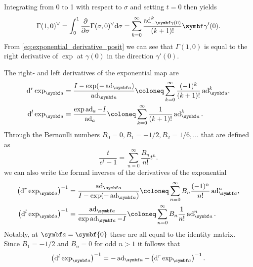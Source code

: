 Integrating from 0 to 1 with respect to $\sigma$ and setting $t = 0$ then yields
\begin{equation}
  \Gamma(1, 0)^\vee = \int_0^1 \frac{\partial}{\partial \sigma} \Gamma(\sigma, 0)^\vee \mathrm{d} \sigma = \sum_{k=0}^\infty \frac{\ad^k_{-\bgamma(0)}}{(k+1)!}\bgamma'(0).
\end{equation}
From \eqref{eq:exponential_derivative_posit} we can see that $\Gamma(1, 0)$ is equal to the right derivative of $\exp$ at $\gamma(0)$ in the direction $\gamma'(0)$.

\begin{properties}
  The right- and left derivatives of the exponential map are
  \begin{equation}
    \label{eq:dexp_def}
    \begin{aligned}
      \mathrm{d}^r \exp_\a & = \frac{I - \exp (-\ad_{\a})}{\ad_{\a}} \coloneq \sum_{k=0}^\infty \frac{(-1)^k }{(k+1)!} \ad^k_{\a}, \\
      \mathrm{d}^l \exp_\a & = \frac{\exp \ad_{a} - I}{\ad_{a}} \coloneq \sum_{k=0}^\infty \frac{1 }{(k+1)!} \ad^k_{\a}.
    \end{aligned}
  \end{equation}
  Through the Bernoulli numbers $B_0 = 0, B_1 = -1/2, B_2 = 1/6, \ldots$ that are defined as
  \begin{equation}
    \label{eq:bernoulli_number_def}
    \frac{t}{e^t - 1} = \sum_{n=0}^\infty \frac{B_n}{n!} t^n.
  \end{equation}
  we can also write the formal inverses of the derivatives of the exponential
  \begin{equation}
    \label{eq:dexpinv_def}
    \begin{aligned}
      \left(\mathrm{d}^r \exp_\a\right)^{-1} & = \frac{\ad_{\a}}{I - \exp (- \ad_{\a})} \coloneq \sum_{n=0}^\infty B_n \frac{(-1)^n}{n!} \ad_{\a}^n, \\
      \left(\mathrm{d}^l \exp_\a\right)^{-1} & = \frac{\ad_{\a}}{\exp \ad_{\a} - I} \coloneq \sum_{n=0}^\infty B_n \frac{1}{n!} \ad_\a^n.
    \end{aligned}
  \end{equation}
  Notably, at $\a = \symbf{0}$ these are all equal to the identity matrix. Since $B_1 = -1/2$ and $B_n = 0$ for odd $n > 1$ it follows that
  \begin{equation}
    \left(\mathrm{d}^l \exp_\a\right)^{-1} = -\ad_\a + \left(\mathrm{d}^r \exp_\a\right)^{-1}.
  \end{equation}
\end{properties}

